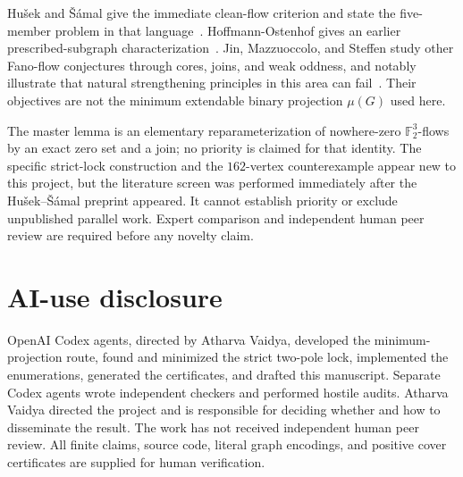 \documentclass[11pt]{article}
\theoremstyle{definition}
\theoremstyle{remark}
\newcommand{\F}{\mathbb F}
\begin{document}
Hu\v{s}ek and \v{S}\'amal give the immediate clean-flow criterion and
state the five-member problem in that language~\cite{HusekSamal2026}.
Hoffmann-Ostenhof gives an earlier prescribed-subgraph
characterization~\cite{HoffmannOstenhof2013}.  Jin, Mazzuoccolo, and
Steffen study other Fano-flow conjectures through cores, joins, and weak
oddness, and notably illustrate that natural strengthening principles in
this area can fail~\cite{JinMazzuoccoloSteffen2018}.  Their objectives
are not the minimum extendable binary projection \(\mu(G)\) used here.

The master lemma is an elementary reparameterization of nowhere-zero
\(\F_2^3\)-flows by an exact zero set and a join; no priority is claimed
for that identity.  The specific strict-lock construction and the
\(162\)-vertex counterexample appear new to this project, but the
literature screen was performed immediately after the Hu\v{s}ek--\v{S}\'amal
preprint appeared.  It cannot establish priority or exclude unpublished
parallel work.  Expert comparison and independent human peer review are
required before any novelty claim.

\section*{AI-use disclosure}

OpenAI Codex agents, directed by Atharva Vaidya, developed the
minimum-projection route, found and minimized the strict two-pole lock,
implemented the enumerations, generated the certificates, and drafted
this manuscript.  Separate Codex agents wrote independent checkers and
performed hostile audits.  Atharva Vaidya directed the project and is
responsible for deciding whether and how to disseminate the result.
The work has not received independent human peer review.  All finite
claims, source code, literal graph encodings, and positive cover
certificates are supplied for human verification.



\end{document}

